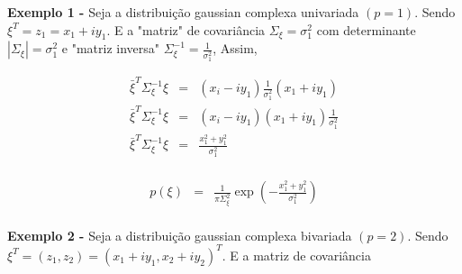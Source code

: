\documentclass[12pt,a4paper]{article}
\begin{document}
{\bf Exemplo 1 -} Seja a distribuição gaussian complexa univariada $(p=1)$. Sendo $\xi^{T}=z_1=x_1+iy_1$. E a "matriz" de covariância $\Sigma_{\xi}=\sigma_{1}^{2}$ com determinante $|\Sigma_{\xi}|=\sigma_{1}^{2}$ e  "matriz inversa" $\Sigma_{\xi}^{-1}=\frac{1}{\sigma_{1}^{2}}$, Assim,

\begin{equation}\label{sec2eqn2}
\begin{array}{ccc}
	\bar{\xi}^{T}\Sigma_{\xi}^{-1}\xi&=&(x_i-iy_1)\frac{1}{\sigma_1^2}(x_1+iy_1)  \\
	\bar{\xi}^{T}\Sigma_{\xi}^{-1}\xi&=&(x_i-iy_1)(x_1+iy_1)\frac{1}{\sigma_1^2}  \\
	\bar{\xi}^{T}\Sigma_{\xi}^{-1}\xi&=&\frac{x_1^2+y_1^2}{\sigma_1^2}  \\
\end{array}
\end{equation}


\begin{equation}\label{sec2eqn3}
\begin{array}{ccc}
	p(\xi)&=&\frac{1}{\pi\Sigma_{\xi}^{2}}\exp\left(-\frac{x_1^2+y_1^2}{\sigma_1^2}\right)  \\
\end{array}
\end{equation}

{\bf Exemplo 2 -} Seja a distribuição gaussian complexa bivariada $(p=2)$. Sendo $\xi^{T}=(z_1, z_2)=(x_1 + iy_1, x_2 + iy_2)^{T}$. E a matriz de covariância 
\end{document}
